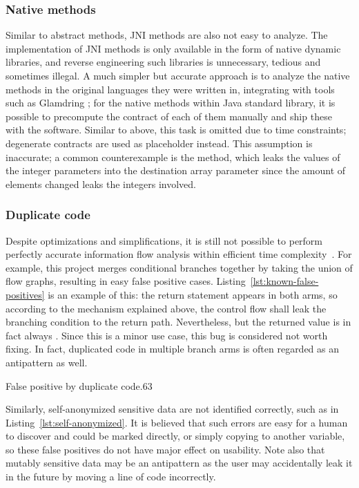 \subsubsection{Native methods}\label{subsubsec:jni}
Similar to abstract methods,
\ac{JNI} methods are also not easy to analyze.
The implementation of \ac{JNI} methods is only available in the form of native dynamic libraries,
and reverse engineering such libraries is unnecessary, tedious and sometimes illegal.
A much simpler but accurate approach
is to analyze the native methods in the original languages they were written in,
integrating with tools such as Glamdring \cite{glamdring};
for the native methods within Java standard library,
it is possible to precompute the contract of each of them manually
and ship these with the software.
Similar to above, this task is omitted due to time constraints;
degenerate contracts are used as placeholder instead.
This assumption is inaccurate;
a common counterexample is the  method,
which leaks the values of the integer parameters into the destination array parameter
since the amount of elements changed leaks the integers involved.

\subsubsection{Duplicate code}\label{subsubsec:duplicate-code}
Despite optimizations and simplifications,
it is still not possible to perform perfectly accurate information flow analysis
within efficient time complexity~\cite{SmithGeoffrey2007PoSI}.
For example, this project merges conditional branches together
by taking the union of flow graphs,
resulting in easy false positive cases.
Listing~\ref{lst:known-false-positives} is an example of this:
the return statement appears in both arms,
so according to the mechanism explained above, the control flow shall leak
the branching condition  to the return path.
Nevertheless, but the returned value is in fact always .
Since this is a minor use case, this bug is considered not worth fixing.
In fact, duplicated code in multiple branch arms
is often regarded as an antipattern as well. %

{False positive by duplicate code}{.6}{3}

Similarly, self-anonymized sensitive data are not identified correctly,
such as in Listing~\ref{lst:self-anonymized}.
It is believed that such errors are easy for a human to discover
and could be marked  directly,
or simply copying  to another variable,
so these false positives do not have major effect on usability.
Note also that mutably sensitive data may be an antipattern
as the user may accidentally leak it in the future
by moving a line of code incorrectly.

